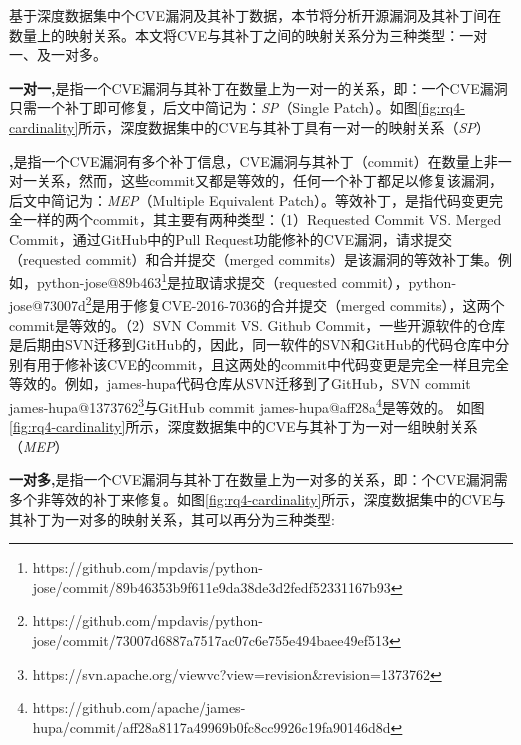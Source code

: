 基于深度数据集中个CVE漏洞及其补丁数据，本节将分析开源漏洞及其补丁间在数量上的映射关系。本文将CVE与其补丁之间的映射关系分为三种类型：一对一、及一对多。

\textbf{一对一,}是指一个CVE漏洞与其补丁在数量上为一对一的关系，即：一个CVE漏洞只需一个补丁即可修复，后文中简记为：\textit{SP}（Single Patch）。如图\ref{fig:rq4-cardinality}所示，深度数据集中的CVE与其补丁具有一对一的映射关系（\textit{SP}）

\textbf{,}是指一个CVE漏洞有多个补丁信息，CVE漏洞与其补丁（commit）在数量上非一对一关系，然而，这些commit又都是等效的，任何一个补丁都足以修复该漏洞，后文中简记为：\textit{MEP}（Multiple Equivalent Patch）。等效补丁，是指代码变更完全一样的两个commit，其主要有两种类型：（1）Requested Commit VS. Merged Commit，通过GitHub中的Pull Request功能修补的CVE漏洞，请求提交（requested commit）和合并提交（merged commits）是该漏洞的等效补丁集。例如，python-jose@89b463\footnote{https://github.com/mpdavis/python-jose/commit/89b46353b9f611e9da38de3d2fedf52331167b93}是拉取请求提交（requested commit），python-jose@73007d\footnote{https://github.com/mpdavis/python-jose/commit/73007d6887a7517ac07c6e755e494baee49ef513}是用于修复CVE-2016-7036的合并提交（merged commits），这两个commit是等效的。（2）SVN Commit VS. Github Commit，一些开源软件的仓库是后期由SVN迁移到GitHub的，因此，同一软件的SVN和GitHub的代码仓库中分别有用于修补该CVE的commit，且这两处的commit中代码变更是完全一样且完全等效的。例如，james-hupa代码仓库从SVN迁移到了GitHub，SVN commit james-hupa@1373762\footnote{https://svn.apache.org/viewvc?view=revision\&revision=1373762}与GitHub commit james-hupa@aff28a\footnote{https://github.com/apache/james-hupa/commit/aff28a8117a49969b0fc8cc9926c19fa90146d8d}是等效的。
如图\ref{fig:rq4-cardinality}所示，深度数据集中的CVE与其补丁为一对一组映射关系（\textit{MEP}）

\textbf{一对多,}是指一个CVE漏洞与其补丁在数量上为一对多的关系，即：个CVE漏洞需多个非等效的补丁来修复。如图\ref{fig:rq4-cardinality}所示，深度数据集中的CVE与其补丁为一对多的映射关系，其可以再分为三种类型: 

